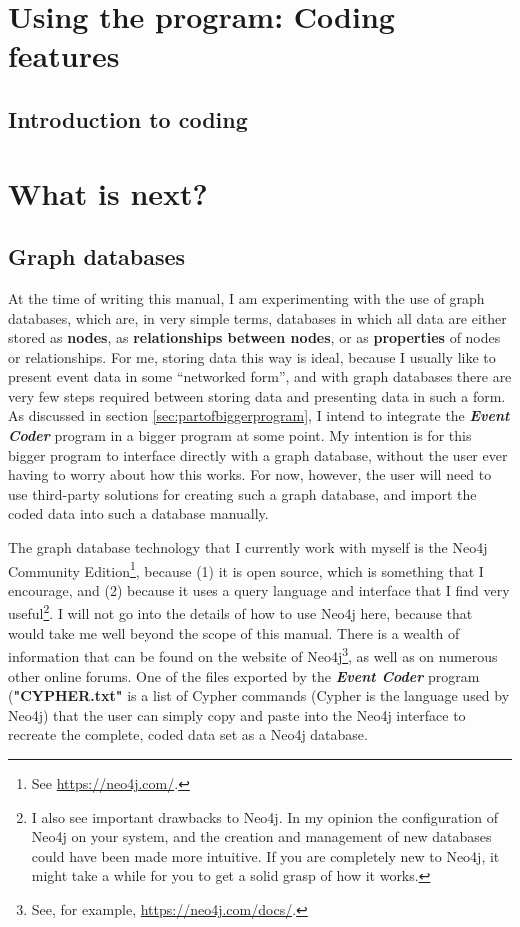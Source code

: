 \documentclass{memoir}
\begin{document}
\chapter{Using the program: Coding features}
\label{chap:usingtheprogram2}

\section{Introduction to coding}
\label{sec:introductiontocoding}


\chapter{What is next?}
\label{chap:whatisnext}



\section{Graph databases}
\label{sec:graphdatabases}

At the time of writing this manual, I am experimenting with the use of graph databases, which are, in very simple terms, databases in which all data are either stored as \textbf{nodes}, as \textbf{relationships between nodes}, or as \textbf{properties} of nodes or relationships. For me, storing data this way is ideal, because I usually like to present event data in some ``networked form'', and with graph databases there are very few steps required between storing data and presenting data in such a form. As discussed in section \ref{sec:partofbiggerprogram}, I intend to integrate the \textbf{\emph{Event Coder}} program in a bigger program at some point. My intention is for this bigger program to interface directly with a graph database, without the user ever having to worry about how this works. For now, however, the user will need to use third-party solutions for creating such a graph database, and import the coded data into such a database manually.

The graph database technology that I currently work with myself is the Neo4j Community Edition\footnote{See \url{https://neo4j.com/}.}, because (1) it is open source, which is something that I encourage, and (2) because it uses a query language and interface that I find very useful\footnote{I also see important drawbacks to Neo4j. In my opinion the configuration of Neo4j on your system, and the creation and management of new databases could have been made more intuitive. If you are completely new to Neo4j, it might take a while for you to get a solid grasp of how it works.}. I will not go into the details of how to use Neo4j here, because that would take me well beyond the scope of this manual. There is a wealth of information that can be found on the website of Neo4j\footnote{See, for example, \url{https://neo4j.com/docs/}.}, as well as on numerous other online forums. One of the files exported by the \emph{\textbf{Event Coder}} program (\textbf{"CYPHER.txt"} is a list of Cypher commands (Cypher is the language used by Neo4j) that the user can simply copy and paste into the Neo4j interface to recreate the complete, coded data set as a Neo4j database.    
\end{document}
